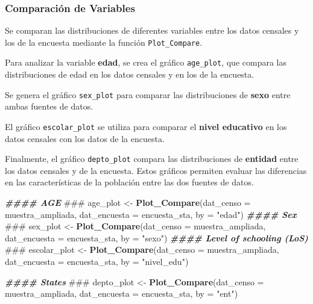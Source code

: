 \documentclass[
  12pt,
]{book}
\newenvironment{Shaded}{\begin{snugshade}}{\end{snugshade}}
\newcommand{\AlertTok}[1]{\textcolor[rgb]{0.94,0.16,0.16}{#1}}
\newcommand{\AttributeTok}[1]{\textcolor[rgb]{0.13,0.29,0.53}{#1}}
\newcommand{\DocumentationTok}[1]{\textcolor[rgb]{0.56,0.35,0.01}{\textbf{\textit{#1}}}}
\newcommand{\FunctionTok}[1]{\textcolor[rgb]{0.13,0.29,0.53}{\textbf{#1}}}
\newcommand{\NormalTok}[1]{#1}
\newcommand{\OtherTok}[1]{\textcolor[rgb]{0.56,0.35,0.01}{#1}}
\newcommand{\StringTok}[1]{\textcolor[rgb]{0.31,0.60,0.02}{#1}}
\begin{document}
\hypertarget{comparaciuxf3n-de-variables}{%
\subsubsection*{Comparación de Variables}\label{comparaciuxf3n-de-variables}}

Se comparan las distribuciones de diferentes variables entre los datos censales y los de la encuesta mediante la función \texttt{Plot\_Compare}.

Para analizar la variable \textbf{edad}, se crea el gráfico \texttt{age\_plot}, que compara las distribuciones de edad en los datos censales y en los de la encuesta.

Se genera el gráfico \texttt{sex\_plot} para comparar las distribuciones de \textbf{sexo} entre ambas fuentes de datos.

El gráfico \texttt{escolar\_plot} se utiliza para comparar el \textbf{nivel educativo} en los datos censales con los datos de la encuesta.

Finalmente, el gráfico \texttt{depto\_plot} compara las distribuciones de \textbf{entidad} entre los datos censales y de la encuesta. Estos gráficos permiten evaluar las diferencias en las características de la población entre las dos fuentes de datos.

\begin{Shaded}
\begin{Highlighting}[]
\DocumentationTok{\#\#\#\# AGE }\AlertTok{\#\#\#}
\NormalTok{age\_plot }\OtherTok{\textless{}{-}}
  \FunctionTok{Plot\_Compare}\NormalTok{(}\AttributeTok{dat\_censo =}\NormalTok{ muestra\_ampliada,}
               \AttributeTok{dat\_encuesta =}\NormalTok{ encuesta\_sta,}
               \AttributeTok{by =} \StringTok{"edad"}\NormalTok{)}
\DocumentationTok{\#\#\#\# Sex }\AlertTok{\#\#\#}
\NormalTok{sex\_plot }\OtherTok{\textless{}{-}}
  \FunctionTok{Plot\_Compare}\NormalTok{(}\AttributeTok{dat\_censo =}\NormalTok{ muestra\_ampliada,}
               \AttributeTok{dat\_encuesta =}\NormalTok{ encuesta\_sta,}
               \AttributeTok{by =} \StringTok{"sexo"}\NormalTok{)}
\DocumentationTok{\#\#\#\# Level of schooling (LoS) }\AlertTok{\#\#\#}
\NormalTok{escolar\_plot }\OtherTok{\textless{}{-}}
  \FunctionTok{Plot\_Compare}\NormalTok{(}\AttributeTok{dat\_censo =}\NormalTok{ muestra\_ampliada,}
               \AttributeTok{dat\_encuesta =}\NormalTok{ encuesta\_sta,}
               \AttributeTok{by =} \StringTok{"nivel\_edu"}\NormalTok{)}

\DocumentationTok{\#\#\#\# States }\AlertTok{\#\#\#}
\NormalTok{depto\_plot }\OtherTok{\textless{}{-}}
  \FunctionTok{Plot\_Compare}\NormalTok{(}\AttributeTok{dat\_censo =}\NormalTok{ muestra\_ampliada,}
               \AttributeTok{dat\_encuesta =}\NormalTok{ encuesta\_sta,}
               \AttributeTok{by =} \StringTok{"ent"}\NormalTok{)}
\end{Highlighting}
\end{Shaded}
\end{document}
